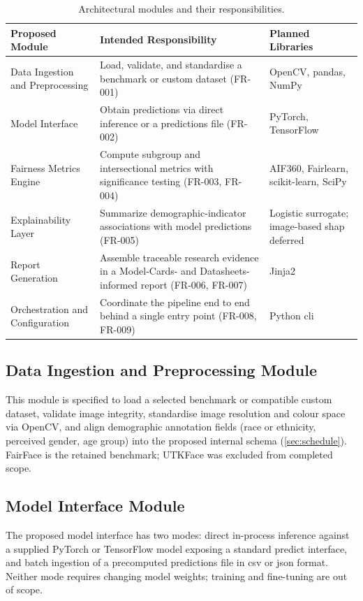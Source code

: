 \begin{table}[htbp]
    \centering
    \renewcommand{\arraystretch}{1.3}
    \caption{Architectural modules and their responsibilities.}
    \label{tab:modules}
    \begin{tabular}{p{3.2cm}p{5cm}p{4.3cm}}
        \toprule
        \textbf{Proposed Module} & \textbf{Intended Responsibility} & \textbf{Planned Libraries} \\
        \midrule
        Data Ingestion and Preprocessing & Load, validate, and standardise a benchmark or custom dataset (FR-001) & OpenCV, pandas, NumPy \\
        Model Interface & Obtain predictions via direct inference or a predictions file (FR-002) & PyTorch, TensorFlow \\
        Fairness Metrics Engine & Compute subgroup and intersectional metrics with significance testing (FR-003, FR-004) & AIF360, Fairlearn, scikit-learn, SciPy \\
        Explainability Layer & Summarize demographic-indicator associations with model predictions (FR-005) & Logistic surrogate; image-based \gls{shap} deferred \\
        Report Generation & Assemble traceable research evidence in a Model-Cards- and Datasheets-informed report (FR-006, FR-007) & Jinja2 \\
        Orchestration and Configuration & Coordinate the pipeline end to end behind a single entry point (FR-008, FR-009) & Python \gls{cli} \\
        \bottomrule
    \end{tabular}
\end{table}
\clearpage

\subsection{Data Ingestion and Preprocessing Module}
This module is specified to load a selected benchmark or compatible custom dataset, validate image integrity, standardise image resolution and colour space via OpenCV, and align demographic annotation fields (race or ethnicity, perceived gender, age group) into the proposed internal schema (\cref{sec:schedule}). FairFace is the retained benchmark; UTKFace was excluded from completed scope.

\subsection{Model Interface Module}
The proposed model interface has two modes: direct in-process inference against a supplied PyTorch or TensorFlow model exposing a standard predict interface, and batch ingestion of a precomputed predictions file in \gls{csv} or \gls{json} format. Neither mode requires changing model weights; training and fine-tuning are out of scope.

